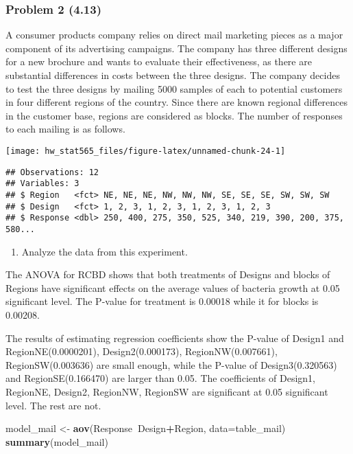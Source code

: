 \documentclass[]{article}
\newenvironment{Shaded}{\begin{snugshade}}{\end{snugshade}}
\newcommand{\DataTypeTok}[1]{\textcolor[rgb]{0.13,0.29,0.53}{#1}}
\newcommand{\KeywordTok}[1]{\textcolor[rgb]{0.13,0.29,0.53}{\textbf{#1}}}
\newcommand{\NormalTok}[1]{#1}
\newcommand{\OperatorTok}[1]{\textcolor[rgb]{0.81,0.36,0.00}{\textbf{#1}}}
\newcommand{\StringTok}[1]{\textcolor[rgb]{0.31,0.60,0.02}{#1}}
\providecommand{\tightlist}{%
  \setlength{\itemsep}{0pt}\setlength{\parskip}{0pt}}
\begin{document}
\hypertarget{problem-2-4.13}{%
\subsubsection{Problem 2 (4.13)}\label{problem-2-4.13}}

A consumer products company relies on direct mail marketing pieces as a
major component of its advertising campaigns. The company has three
different designs for a new brochure and wants to evaluate their
effectiveness, as there are substantial differences in costs between the
three designs. The company decides to test the three designs by mailing
5000 samples of each to potential customers in four different regions of
the country. Since there are known regional differences in the customer
base, regions are considered as blocks. The number of responses to each
mailing is as follows.

\texttt{[image: hw\_stat565\_files/figure-latex/unnamed-chunk-24-1]}

\begin{verbatim}
## Observations: 12
## Variables: 3
## $ Region   <fct> NE, NE, NE, NW, NW, NW, SE, SE, SE, SW, SW, SW
## $ Design   <fct> 1, 2, 3, 1, 2, 3, 1, 2, 3, 1, 2, 3
## $ Response <dbl> 250, 400, 275, 350, 525, 340, 219, 390, 200, 375, 580...
\end{verbatim}

\begin{enumerate}
\def\labelenumi{(\alph{enumi})}
\tightlist
\item
  Analyze the data from this experiment.
\end{enumerate}

The ANOVA for RCBD shows that both treatments of Designs and blocks of
Regions have significant effects on the average values of bacteria
growth at 0.05 significant level. The P-value for treatment is 0.00018
while it for blocks is 0.00208.

The results of estimating regression coefficients show the P-value of
Design1 and RegionNE(0.0000201), Design2(0.000173), RegionNW(0.007661),
RegionSW(0.003636) are small enough, while the P-value of
Design3(0.320563) and RegionSE(0.166470) are larger than 0.05. The
coefficients of Design1, RegionNE, Design2, RegionNW, RegionSW are
significant at 0.05 significant level. The rest are not.

\begin{Shaded}
\begin{Highlighting}[]
\NormalTok{model_mail <-}\StringTok{ }\KeywordTok{aov}\NormalTok{(Response}\OperatorTok{~}\NormalTok{Design}\OperatorTok{+}\NormalTok{Region, }\DataTypeTok{data=}\NormalTok{table_mail)}
\KeywordTok{summary}\NormalTok{(model_mail)}
\end{Highlighting}
\end{Shaded}
\end{document}
